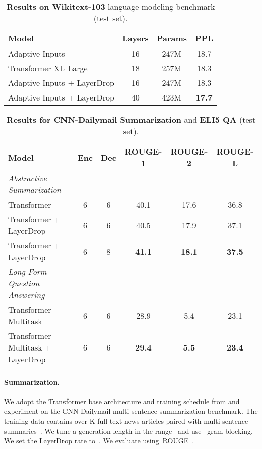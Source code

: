 \begin{table}[t]
\centering
\begin{tabular}{lccc}
\toprule
Model & Layers & Params & PPL \\
\midrule
Adaptive Inputs \citep{baevski2018adaptive} & 16 & 247M & 18.7 \\
Transformer XL Large \citep{dai2019transformer} & 18 & 257M & 18.3 \\
\midrule
Adaptive Inputs + LayerDrop & 16 & 247M & 18.3 \\
Adaptive Inputs + LayerDrop & 40 & 423M & \bf 17.7 \\
\bottomrule
\end{tabular}
\caption{
\textbf{Results on Wikitext-103} language modeling benchmark (test set).
}
\label{tab:wiki103_regularization}
\end{table}

\begin{table}[th]
\centering
\begin{tabular}{lccccc}
\toprule
Model & Enc & Dec & ROUGE-1 & ROUGE-2 & ROUGE-L \\
\midrule
\textit{Abstractive Summarization} & & & & & \\
Transformer \citep{edunov2019pre} & 6 & 6 & 40.1 & 17.6 & 36.8 \\
Transformer + LayerDrop & 6 & 6 & 40.5 & 17.9 & 37.1 \\
Transformer + LayerDrop & 6 & 8 & \bf 41.1 & \bf 18.1 & \bf 37.5 \\
\midrule
\textit{Long Form Question Answering} & & & & & \\
Transformer Multitask~\citep{fan2019eli5} & 6 & 6 & 28.9 & 5.4 & 23.1 \\
Transformer Multitask + LayerDrop & 6 & 6 & \bf 29.4 & \bf 5.5 & \bf 23.4 \\
\bottomrule
\end{tabular}
\caption{
\textbf{Results for CNN-Dailymail Summarization} and \textbf{ELI5 QA} (test set).}
\label{tab:tasks_regularization}
\end{table}


\paragraph{Summarization.}

We adopt the Transformer base architecture and training schedule from \cite{edunov2019pre} and experiment on the CNN-Dailymail multi-sentence summarization benchmark.
The training data contains over K full-text news articles paired with multi-sentence summaries~\citep{hermann15, see2017acl}.
We tune a generation length in the range~ and use~-gram blocking. We set the LayerDrop rate  to~.
We evaluate using~ROUGE~\citep{lin04rouge}.

